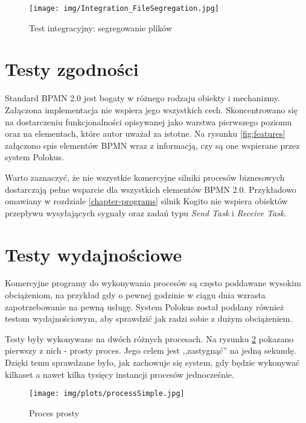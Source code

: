 \documentclass[declaration,shortabstract,mgr]{iithesis}
\newcommand{\bpmn}{BPMN }
\begin{document}
\begin{figure}[h]
     \centering
     \texttt{[image: img/Integration\_FileSegregation.jpg]}
     \caption{Test integracyjny: segregowanie plików}
     \label{fig:integration-segregation}
\end{figure}




\section{Testy zgodności}

Standard \bpmn 2.0 jest bogaty w różnego rodzaju obiekty i mechanizmy. Załączona implementacja nie wspiera jego wszystkich cech. Skoncentrowano się na dostarczeniu funkcjonalności opisywanej jako warstwa pierwszego poziomu oraz na elementach, które autor uważał za istotne. Na rysunku \ref{fig:features} załączono spis elementów \bpmn wraz z informacją, czy są one wspierane przez system Polokus.

Warto zaznaczyć, że nie wszystkie komercyjne silniki procesów biznesowych dostarczają pełne wsparcie dla wszystkich elementów \bpmn 2.0. Przykładowo omawiany w rozdziale \ref{chapter-programs} silnik Kogito nie wspiera obiektów przepływu wysyłających sygnały oraz zadań typu \textit{Send Task} i \textit{Receive Task}.

\section{Testy wydajnościowe}

Komercyjne programy do wykonywania procesów są często poddawane wysokim obciążeniom, na przykład gdy o pewnej godzinie w ciągu dnia wzrasta zapotrzebowanie na pewną usługę. System Polokus został poddany również testom wydajnościowym, aby sprawdzić jak radzi sobie z dużym obciążeniem.

Testy były wykonywane na dwóch różnych procesach. Na rysunku \ref{process-simple} pokazano pierwszy z nich - prosty proces. Jego celem jest ,,zastygnąć'' na jedną sekundę. Dzięki temu sprawdzane było, jak zachowuje się system, gdy będzie wykonywać kilkaset a nawet kilka tysięcy instancji procesów jednocześnie.

\begin{figure}[h]
     \centering
     \texttt{[image: img/plots/processSimple.jpg]}
     \caption{Proces prosty}
     \label{process-simple}
\end{figure}
\end{document}
